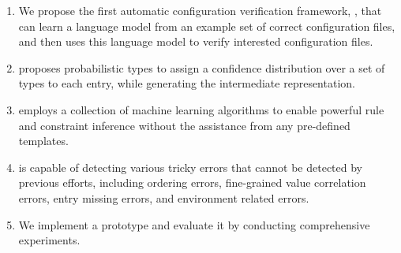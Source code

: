 \begin{enumerate}

\item We propose the first automatic configuration verification
framework, \app, that can learn a language model from an example set of 
correct configuration files, and then uses this language model to verify 
interested configuration files.
 
\item \app proposes probabilistic types to assign a confidence 
distribution over a set of types to each entry, 
while generating the intermediate representation. 

\item \app employs a collection of machine learning algorithms to 
enable powerful rule and constraint inference without the assistance 
from any pre-defined templates.

\item \app is capable of detecting various tricky errors that cannot
be detected by previous efforts,
including ordering errors, fine-grained value correlation errors, 
entry missing errors, and environment related errors. 

\item We implement a \app prototype and evaluate it by
conducting comprehensive experiments.

\end{enumerate}
